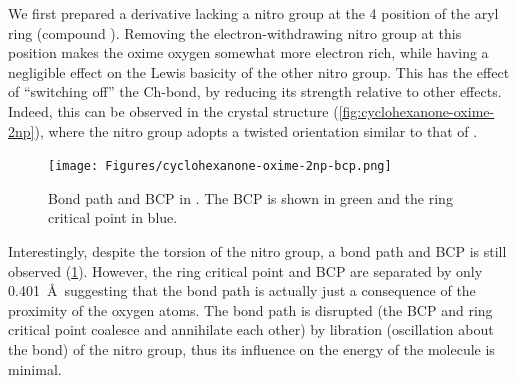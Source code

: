 \begin{refsection}
We first prepared a derivative lacking a nitro group at the 4 position of the aryl ring (compound ).
Removing the electron-withdrawing nitro group at this position makes the oxime oxygen somewhat more electron rich, while having a negligible effect on the Lewis basicity of the other nitro group.
This has the effect of ``switching off'' the Ch-bond, by reducing its strength relative to other effects.
Indeed, this can be observed in the crystal structure (\cref{fig:cyclohexanone-oxime-2np}), where the nitro group adopts a twisted orientation similar to that of .

\begin{figure}
    \texttt{[image: Figures/cyclohexanone-oxime-2np-bcp.png]}
    \caption[Bond path and BCP in .]{Bond path and BCP in . The BCP is shown in green and the ring critical point in blue.}\label{fig:cyclohexanone-oxime-2np-bcp}
\end{figure}

Interestingly, despite the torsion of the nitro group, a bond path and BCP is still observed (\cref{fig:cyclohexanone-oxime-2np-bcp}).
However, the ring critical point and BCP are separated by only 0.401~\AA\ suggesting that the bond path is actually just a consequence of the proximity of the oxygen atoms.
The bond path is disrupted (the BCP and ring critical point coalesce and annihilate each other) by libration (oscillation about the  bond) of the nitro group, thus its influence on the energy of the molecule is minimal.\autocite{Farrugia2006}


\end{refsection}
